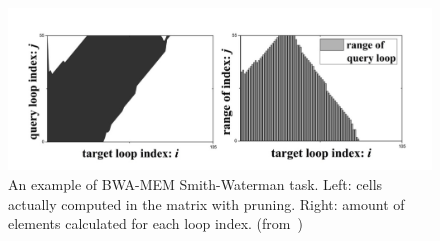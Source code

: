\begin{figure}[h!]
    \centering
    \includegraphics[width=0.9\linewidth]{banded}
    \caption{An example of BWA-MEM Smith-Waterman task. Left: cells actually computed in the matrix with pruning. Right: amount of elements calculated for each loop index. (from~\cite{Chen:acc})}
    \label{fig:banded}
\end{figure}{}
